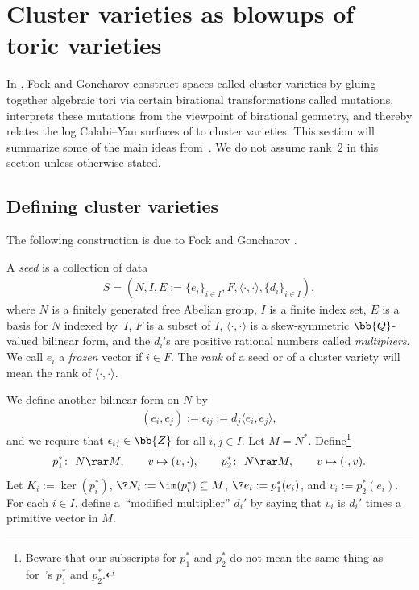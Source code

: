 \section{Cluster varieties as blowups of toric varieties} \label{cluster}

In \cite{FG1}, Fock and Goncharov construct spaces called cluster varieties by gluing together algebraic tori via certain birational transformations called mutations. \cite{GHK3} interprets these mutations from the viewpoint of birational geometry, and thereby relates the log Calabi--Yau surfaces of \cite{GHK1} to cluster varieties. This section will summarize some of the main ideas from~\cite{GHK3}. We do not assume rank~$2$ in this section unless otherwise stated.

\subsection{Defining cluster varieties}\label{ClusterDefs}
The following construction is due to Fock and Goncharov \cite{FG1}.

\begin{dfn}A {\it seed} is a collection of data
\begin{gather*} S=(N,I,E:=\{e_i\}_{i\in I},F,\langle\cdot,\cdot\rangle,\{d_i\}_{i\in I}),\end{gather*}
where $N$ is a finitely generated free Abelian group, $I$ is a finite index set, $E$ is a basis for $N$ indexed by~$I$, $F$ is a subset of $I$, $\langle \cdot,\cdot\rangle$ is a skew-symmetric $\bb{Q}$-valued bilinear form, and the $d_i$'s are positive rational numbers called {\it multipliers}. We call $e_i$ a {\it frozen} vector if $i \in F$. The {\it rank} of a seed or of a cluster variety will mean the rank of $\langle \cdot, \cdot \rangle$.

We define another bilinear form on $N$ by
\begin{gather*} (e_i,e_j):=\epsilon_{ij}:=d_j\langle e_i,e_j \rangle,\end{gather*} and we require that $\epsilon_{ij}\in \bb{Z}$ for all $i,j\in I$.
 Let $M=N^*$. Define\footnote{Beware that our subscripts for $p_1^*$ and $p_2^*$ do not mean the same thing as for~\cite{GHK3}'s $p_1^*$ and $p_2^*$.}
 \begin{gather*} p_1^*\colon \ N\rar M,\qquad v\mapsto (v,\cdot), \qquad p_2^*\colon \ N\rar M,\qquad v\mapsto (\cdot,v).
 \end{gather*} Let $K_i:= \ker (p_i^*)$, $\?{N_i} := \im(p_i^*)\subseteq M$, $\?{e_i}:=p_1^*(e_i)$, and $v_i:=p_2^*(e_i)$. For each $i\in I$, define a~``modified multiplier'' $d_i'$ by saying that $v_i$ is $d_i'$ times a primitive vector in $M$.
\end{dfn}

